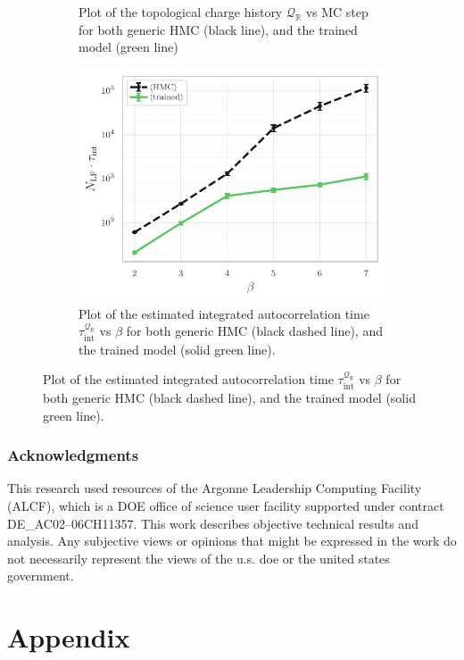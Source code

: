 \documentclass{article} %
\begin{document}
{\begin{figure}[htpb]
\begin{subfigure}{0.48\textwidth}
      \caption{\label{fig:topological_freezing}Plot of the topological charge history \(\mathcal{Q}_{\mathbb{R}}\) vs MC
      step for both generic HMC (black line), and the trained model (green line)}
   \end{subfigure}
   \hfill
   \begin{subfigure}{0.48\textwidth}
      \includegraphics[width=\textwidth]{figures/autocorr_vs_beta.pdf}
      \caption{\label{fig:autocorr_vs_beta}Plot of the estimated integrated autocorrelation time \(\tau_{\mathrm{int}}^{\mathcal{Q}_{\mathbb{R}}}\)
      vs \(\beta\) for both generic HMC (black dashed line), and the trained model (solid green line).}
   \end{subfigure}
\end{figure}
%

\subsubsection*{Acknowledgments}
This research used resources of the Argonne Leadership Computing Facility (ALCF), which is a DOE office of science user
facility supported under contract DE\_AC02--06CH11357.%
%
This work describes objective technical results and analysis.
%
Any subjective views or opinions that might be expressed in the work do not necessarily represent the views of the u.s.
doe or the united states government.




\appendix
\section{Appendix}
%
}
\end{document}
